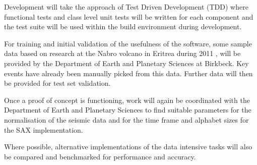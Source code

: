 \documentclass[11pt]{scrartcl}
\begin{document}
	Development will take the approach of Test Driven Development (TDD) where functional tests and class level unit tests will be written for each component and the test suite will be used within the build environment during development.
	
	For training and initial validation of the usefulness of the software, some sample data based on research at the Nabro volcano in Eritrea during 2011 \citep{eritrea1}, \citep{eritrea2} will be provided by the Department of Earth and Planetary Sciences at Birkbeck.  Key events have already been manually picked from this data.  Further data will then be provided for test set validation.
	
	Once a proof of concept is functioning, work will again be coordinated with the Department of Earth and Planetary Sciences to find suitable parameters for the normalisation of the seismic data and for the time frame and alphabet sizes for the SAX implementation.
	
	Where possible, alternative implementations of the data intensive tasks will also be compared and benchmarked for performance and accuracy.



\end{document}
